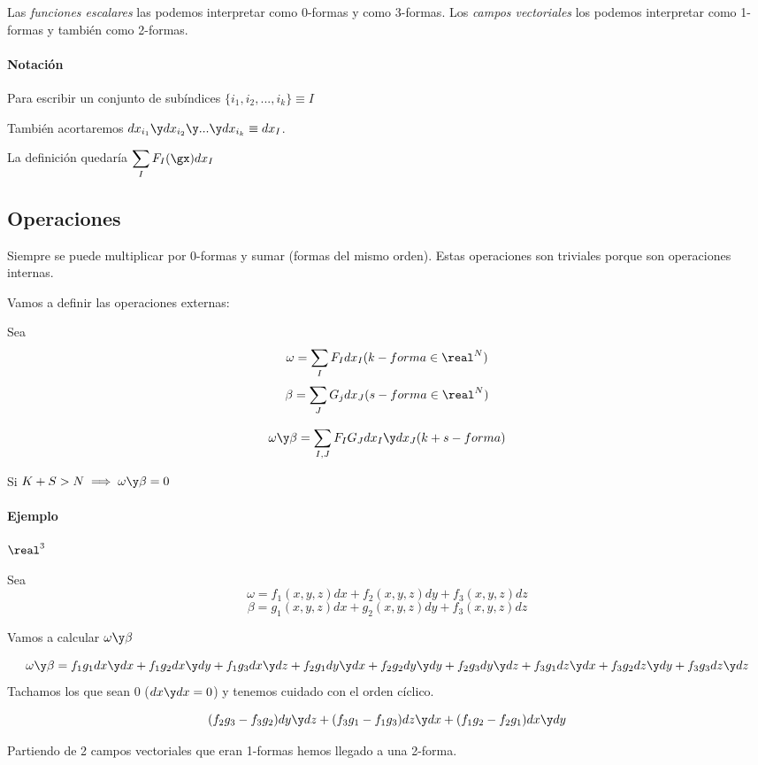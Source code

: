\obs Las \textit{funciones escalares } las podemos interpretar como 0-formas y como 3-formas. Los \textit{campos vectoriales} los podemos interpretar como 1-formas y también como 2-formas.

\paragraph{Notación}
Para escribir un conjunto de subíndices $\{i_1,i_2,...,i_k\} \equiv I$

También acortaremos  $dx_{i_1} \y dx_{i_2} \y ... \y dx_{i_k} \equiv dx_I$. 

La definición quedaría $\displaystyle \sum_I F_I(\gx)dx_I$

\subsection{Operaciones}
Siempre se puede multiplicar por 0-formas y sumar (formas del mismo orden). Estas operaciones son triviales porque son operaciones internas.

Vamos a definir las operaciones externas:

\begin{defn}
Sea \[\omega = \sum_I F_I dx_I (k-forma\in\real^N)\]
\[\beta = \sum_J G_j dx_J (s-forma\in\real^N)\]

\[\omega\y\beta = \sum_{I,J} F_IG_J dx_I\y dx_J (k+s-forma)\]
\end{defn}

\obs Si $K+S>N \implies \omega\y\beta=0$


\paragraph{Ejemplo} $\real^3$

Sea \[\omega = f_1(x,y,z)dx + f_2(x,y,z)dy + f_3(x,y,z) dz\]
\[\beta= g_1(x,y,z)dx + g_2 (x,y,z) dy + f_3 (x,y,z) dz\]

Vamos a calcular $\omega\y\beta$

\[
\omega\y\beta  = f_1g_1dx\y dx + f_1g_2dx\y dy + f_1g_3dx\y dz + f_2g_1dy\y dx + f_2g_2dy\y dy + f_2g_3dy\y dz+ f_3g_1dz\y dx+f_3g_2dz\y dy+f_3g_3dz\y dz
\]
Tachamos los que sean 0 ($dx\y dx = 0$) y tenemos cuidado con el orden cíclico.

\[
(f_2g_3-f_3g_2)dy\y dz + (f_3g_1-f_1g_3)dz\y dx + (f_1g_2 - f_2g_1) dx \y dy
\]

Partiendo de 2 campos vectoriales que eran 1-formas hemos llegado a una 2-forma. 

